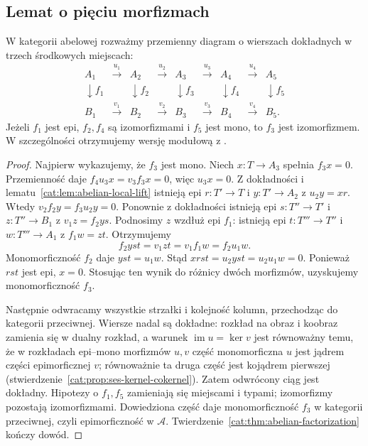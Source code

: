 \subsection{Lemat o pięciu morfizmach}
\begin{twierdzenie}\label{cat:thm:five-lemma}
W kategorii abelowej rozważmy przemienny diagram o wierszach dokładnych w trzech środkowych miejscach:
\[
\begin{array}{ccccccccc}
 A_1&\xrightarrow{u_1}&A_2&\xrightarrow{u_2}&A_3&\xrightarrow{u_3}&A_4&\xrightarrow{u_4}&A_5\\
 \downarrow f_1&&\downarrow f_2&&\downarrow f_3&&\downarrow f_4&&\downarrow f_5\\
 B_1&\xrightarrow{v_1}&B_2&\xrightarrow{v_2}&B_3&\xrightarrow{v_3}&B_4&\xrightarrow{v_4}&B_5 .
\end{array}
\]
Jeżeli $f_1$ jest epi, $f_2,f_4$ są izomorfizmami i $f_5$ jest mono, to $f_3$ jest izomorfizmem. W szczególności otrzymujemy wersję modułową z .
\end{twierdzenie}
\begin{proof}
Najpierw wykazujemy, że $f_3$ jest mono. Niech $x:T\to A_3$ spełnia $f_3x=0$. Przemienność daje $f_4u_3x=v_3f_3x=0$, więc $u_3x=0$. Z dokładności i lematu~\ref{cat:lem:abelian-local-lift} istnieją epi $r:T'\to T$ i $y:T'\to A_2$ z $u_2y=xr$. Wtedy $v_2f_2y=f_3u_2y=0$. Ponownie z dokładności istnieją epi $s:T''\to T'$ i $z:T''\to B_1$ z $v_1z=f_2ys$. Podnosimy $z$ wzdłuż epi $f_1$: istnieją epi $t:T'''\to T''$ i $w:T'''\to A_1$ z $f_1w=zt$. Otrzymujemy
\[
 f_2yst=v_1zt=v_1f_1w=f_2u_1w.
\]
Monomorficzność $f_2$ daje $yst=u_1w$. Stąd $xrst=u_2yst=u_2u_1w=0$. Ponieważ $rst$ jest epi, $x=0$. Stosując ten wynik do różnicy dwóch morfizmów, uzyskujemy monomorficzność $f_3$.

Następnie odwracamy wszystkie strzałki i kolejność kolumn, przechodząc do kategorii przeciwnej. Wiersze nadal są dokładne: rozkład na obraz i koobraz zamienia się w dualny rozkład, a warunek $\operatorname{im}u=\ker v$ jest równoważny temu, że w rozkładach epi--mono morfizmów $u,v$ część monomorficzna $u$ jest jądrem części epimorficznej $v$; równoważnie ta druga część jest kojądrem pierwszej (stwierdzenie~\ref{cat:prop:ses-kernel-cokernel}). Zatem odwrócony ciąg jest dokładny. Hipotezy o $f_1,f_5$ zamieniają się miejscami i typami; izomorfizmy pozostają izomorfizmami. Dowiedziona część daje monomorficzność $f_3$ w kategorii przeciwnej, czyli epimorficzność w $\mathcal A$. Twierdzenie~\ref{cat:thm:abelian-factorization} kończy dowód.
\end{proof}

